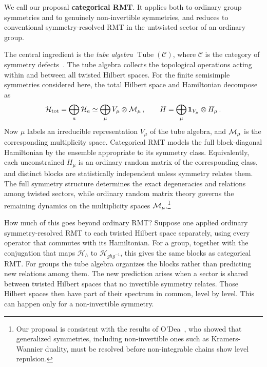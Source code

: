 \documentclass[11pt]{article}
\numberwithin{equation}{section}
\begin{document}
We call our proposal \textbf{categorical RMT}. It applies both to ordinary group symmetries and to genuinely non-invertible symmetries, and reduces to conventional symmetry-resolved RMT in the untwisted sector of an ordinary group.

The central ingredient is the \textit{tube algebra} $\operatorname{Tube}(\mathcal C)$, where $\mathcal C$ is the category of symmetry defects~\cite{Izumi:2000qa,Lin:2022dhv,Bartsch:2023wvv,Benini:2025lav}. The tube algebra collects the topological operations acting within and between all twisted Hilbert spaces. For the finite semisimple symmetries considered here, the total Hilbert space and Hamiltonian decompose as
\begin{equation}
\label{eq:catrmtintro}
    \mathcal H_{\mathrm{tot}}
    =
    \bigoplus_a\mathcal H_a
    \simeq
    \bigoplus_\mu V_\mu\otimes \mathcal{M}_\mu\,,
    \qquad
    H
    =
    \bigoplus_\mu
    \mathbf{1}_{V_\mu}\otimes H_\mu\,.
\end{equation}
Now $\mu$ labels an irreducible representation $V_\mu$ of the tube algebra, and $\mathcal{M}_\mu$ is the corresponding multiplicity space. Categorical RMT models the full block-diagonal Hamiltonian by the ensemble appropriate to its symmetry class. Equivalently, each unconstrained $H_\mu$ is an ordinary random matrix of the corresponding class, and distinct blocks are statistically independent unless symmetry relates them. The full symmetry structure determines the exact degeneracies and relations among twisted sectors, while ordinary random matrix theory governs the remaining dynamics on the multiplicity spaces $\mathcal{M}_\mu$.\footnote{Our proposal is consistent with the results of O’Dea~\cite{ODea:2024tkt}, who showed that generalized symmetries, including non-invertible ones such as Kramers-Wannier duality, must be resolved before non-integrable chains show level repulsion.}

How much of this goes beyond ordinary RMT? Suppose one applied ordinary symmetry-resolved RMT to each twisted Hilbert space separately, using every operator that commutes with its Hamiltonian. For a group, together with the conjugation that maps $\mathcal H_h$ to $\mathcal H_{ghg^{-1}}$, this gives the same blocks as categorical RMT. For groups the tube algebra organizes the blocks rather than predicting new relations among them. The new prediction arises when a sector is shared between twisted Hilbert spaces that no invertible symmetry relates. Those Hilbert spaces then have part of their spectrum in common, level by level. This can happen only for a non-invertible symmetry.
\end{document}
